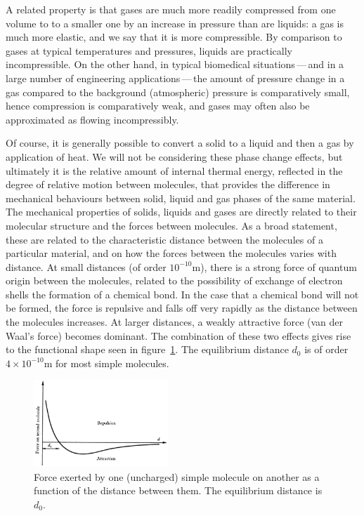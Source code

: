 \documentclass[twoside,11pt]		{report}
\begin{document}
A related property is that gases are much more readily compressed from
one volume to to a smaller one by an increase in pressure than are
liquids: a gas is much more elastic, and we say that it is more
compressible. By comparison to gases at typical temperatures and
pressures, liquids are practically incompressible. On the other hand,
in typical biomedical situations\,---\,and in a large number of
engineering applications\,---\,the amount of pressure change in a gas
compared to the background (atmospheric) pressure is comparatively
small, hence compression is comparatively weak, and gases may often
also be approximated as flowing incompressibly.

Of course, it is generally possible to convert a solid to a liquid and
then a gas by application of heat. We will not be considering these
phase change effects, but ultimately it is the relative amount of
internal thermal energy, reflected in the degree of relative motion
between molecules, that provides the difference in mechanical
behaviours between solid, liquid and gas phases of the same
material. The mechanical properties of solids, liquids and gases are
directly related to their molecular structure and the forces between
molecules. As a broad statement, these are related to the
characteristic distance between the molecules of a particular
material, and on how the forces between the molecules varies with
distance. At small distances (of order $10^{-10}$m), there is a strong
force of quantum origin between the molecules, related to the
possibility of exchange of electron shells \ie the formation of a
chemical bond. In the case that a chemical bond will not be formed,
the force is repulsive and falls off very rapidly as the distance
between the molecules increases. At larger distances, a weakly
attractive force (van der Waal's force) becomes dominant. The
combination of these two effects gives rise to the functional shape
seen in figure~\ref{fig.lj}. The equilibrium distance $d_0$ is of
order $4\times10^{-10}$m for most simple molecules.

\begin{figure}
\begin{center}
\includegraphics[width=0.45\textwidth]{Bat-1.1.1.eps}
\end{center}
\caption{Force exerted by one (uncharged) simple molecule on another
  as a function of the distance between them. The equilibrium distance
  is $d_0$. \citep[From][]{bat67}}
\label{fig.lj}
\end{figure}
\end{document}
